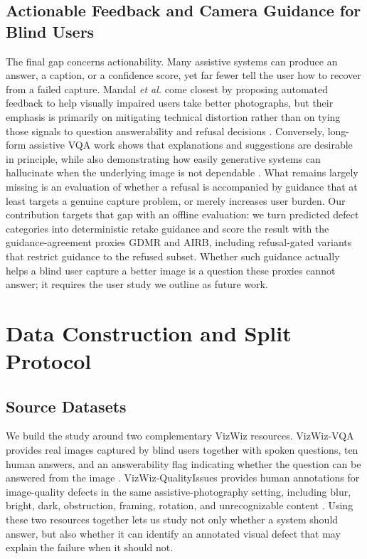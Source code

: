 \documentclass{ieeeaccess}
\newcommand{\arr}{\mathrm{GDMR}}
\newcommand{\frr}{\mathrm{AIRB}}
\begin{document}
\subsection{Actionable Feedback and Camera Guidance for Blind Users}
The final gap concerns actionability. Many assistive systems can produce an answer, a caption, or a confidence score, yet far fewer tell the user how to recover from a failed capture. Mandal \emph{et al.} come closest by proposing automated feedback to help visually impaired users take better photographs, but their emphasis is primarily on mitigating technical distortion rather than on tying those signals to question answerability and refusal decisions \cite{mandal2023helping}. Conversely, long-form assistive VQA work shows that explanations and suggestions are desirable in principle, while also demonstrating how easily generative systems can hallucinate when the underlying image is not dependable \cite{huh2024longform}. What remains largely missing is an evaluation of whether a refusal is accompanied by guidance that at least targets a genuine capture problem, or merely increases user burden. Our contribution targets that gap with an offline evaluation: we turn predicted defect categories into deterministic retake guidance and score the result with the guidance-agreement proxies $\arr$ and $\frr$, including refusal-gated variants that restrict guidance to the refused subset. Whether such guidance actually helps a blind user capture a better image is a question these proxies cannot answer; it requires the user study we outline as future work.

\section{Data Construction and Split Protocol}
\label{sec:data}

\subsection{Source Datasets}
We build the study around two complementary VizWiz resources. VizWiz-VQA provides real images captured by blind users together with spoken questions, ten human answers, and an answerability flag indicating whether the question can be answered from the image \cite{gurari2018vizwiz}. VizWiz-QualityIssues provides human annotations for image-quality defects in the same assistive-photography setting, including blur, bright, dark, obstruction, framing, rotation, and unrecognizable content \cite{chiu2020assessing}. Using these two resources together lets us study not only whether a system should answer, but also whether it can identify an annotated visual defect that may explain the failure when it should not.
\end{document}
